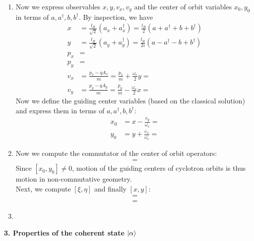 \documentclass{article}
\theoremstyle{definition}
\newcommand{\al}{\alpha}
\newcommand{\f}[2]{\frac{#1}{#2}}
\begin{document}
\begin{enumerate}[label=\alph*)]
	\item Now we express observables $x,y,v_x,v_y$ and the center of orbit variables $x_0,y_0$ in terms of $a,a^\dagger,b,b^\dagger$. By inspection, we have
	\begin{align*}
	x &= \f{l_B}{\sqrt{2}}(a_x + a_x^\dagger) = \f{l_B}{2}(a+a^\dagger + b + b^\dagger) \\
	y &= \f{l_B}{\sqrt{2}}(a_y + a_y^\dagger) = \f{l_B}{2i}(a-a^\dagger - b + b^\dagger) \\
	p_x &= \\
	p_y &= \\
	v_x &= \f{p_x - qA_x}{m} = \f{p_x}{m} + \f{\omega_c}{2}y = \\
	v_y &= \f{p_y - qA_y}{m} = \f{p_y}{m} - \f{\omega_c}{2}x =
	\end{align*}
	Now we define the guiding center variables (based on the classical solution) and express them in terms of $a,a^\dagger,b,b^\dagger$:
	\begin{align*}
	x_0 &= x - \f{v_y}{\omega_c} = \\
	y_0 &= y + \f{v_x}{\omega_c} = 
	\end{align*}
	
	
	\item Now we compute the commutator of the center of orbit operators:
	\begin{align*}
	[x_0, y_0] = 
	\end{align*}
	Since $[x_0,y_0] \neq 0$, motion of the guiding centers of cyclotron orbits is thus motion in non-commutative geometry. \\
	
	\noindent Next, we compute $[\xi,\eta]$ and finally $[x,y]$:
	\begin{align*}
	[\xi,\eta] = 
	\end{align*}
	\begin{align*}
	[x,y] = 
	\end{align*}
	
	\item 
\end{enumerate}


\noindent \textbf{3. Properties of the coherent state $\ket{\al}$}
\end{document}
